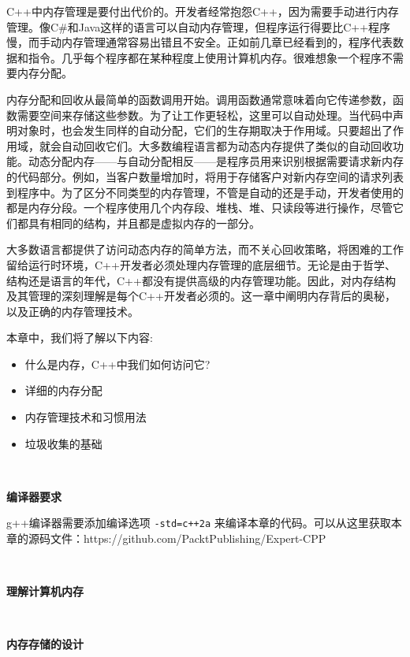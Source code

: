 C++中内存管理是要付出代价的。开发者经常抱怨C++，因为需要手动进行内存管理。像C\#和Java这样的语言可以自动内存管理，但程序运行得要比C++程序慢，而手动内存管理通常容易出错且不安全。正如前几章已经看到的，程序代表数据和指令。几乎每个程序都在某种程度上使用计算机内存。很难想象一个程序不需要内存分配。 \par
内存分配和回收从最简单的函数调用开始。调用函数通常意味着向它传递参数，函数需要空间来存储这些参数。为了让工作更轻松，这里可以自动处理。当代码中声明对象时，也会发生同样的自动分配，它们的生存期取决于作用域。只要超出了作用域，就会自动回收它们。大多数编程语言都为动态内存提供了类似的自动回收功能。动态分配内存——与自动分配相反——是程序员用来识别根据需要请求新内存的代码部分。例如，当客户数量增加时，将用于存储客户对新内存空间的请求列表到程序中。为了区分不同类型的内存管理，不管是自动的还是手动，开发者使用的都是内存分段。一个程序使用几个内存段、堆栈、堆、只读段等进行操作，尽管它们都具有相同的结构，并且都是虚拟内存的一部分。 \par
大多数语言都提供了访问动态内存的简单方法，而不关心回收策略，将困难的工作留给运行时环境，C++开发者必须处理内存管理的底层细节。无论是由于哲学、结构还是语言的年代，C++都没有提供高级的内存管理功能。因此，对内存结构及其管理的深刻理解是每个C++开发者必须的。这一章中阐明内存背后的奥秘，以及正确的内存管理技术。 \par
本章中，我们将了解以下内容: \par

\begin{itemize}
	\item 什么是内存，C++中我们如何访问它?
	\item 详细的内存分配
	\item 内存管理技术和习惯用法
	\item 垃圾收集的基础
\end{itemize}

\noindent\textbf{}\ \par
\textbf{编译器要求} \ \par
g++编译器需要添加编译选项 \texttt{-std=c++2a} 来编译本章的代码。可以从这里获取本章的源码文件：https:/​/github.​com/PacktPublishing/Expert-CPP \par

\noindent\textbf{}\ \par
\textbf{理解计算机内存} \ \par


\noindent\textbf{}\ \par
\textbf{内存存储的设计} \ \par


